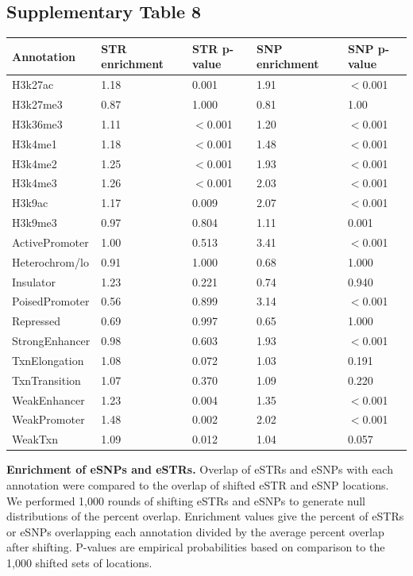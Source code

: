\subsection{Supplementary Table 8}
\label{tab:estrsuptab8}
\begin{table}[h!]
\begin{tabular}{l|l|l|l|l}
Annotation & STR enrichment & STR p-value & SNP enrichment & SNP p-value \\
\hline
H3k27ac & 1.18 & 0.001 & 1.91 & $<$0.001 \\
H3k27me3 & 0.87 & 1.000 & 0.81 & 1.00 \\
H3k36me3 & 1.11 & $<$0.001 & 1.20 & $<$0.001 \\
H3k4me1 & 1.18 & $<$0.001 & 1.48 & $<$0.001 \\
H3k4me2 & 1.25 & $<$0.001 & 1.93 & $<$0.001 \\
H3k4me3 & 1.26 & $<$0.001 & 2.03 & $<$0.001 \\
H3k9ac & 1.17 & 0.009 & 2.07 & $<$0.001 \\
H3k9me3 & 0.97 & 0.804 & 1.11 & 0.001 \\
\hline
ActivePromoter & 1.00 & 0.513 & 3.41 & $<$0.001 \\
Heterochrom/lo & 0.91 & 1.000 & 0.68 & 1.000 \\
Insulator & 1.23 & 0.221 & 0.74 & 0.940 \\
PoisedPromoter & 0.56 & 0.899 & 3.14 & $<$0.001 \\
Repressed & 0.69 & 0.997 & 0.65 & 1.000 \\
StrongEnhancer & 0.98 & 0.603 & 1.93 & $<$0.001  \\
TxnElongation & 1.08 & 0.072 & 1.03 & 0.191 \\
TxnTransition & 1.07 & 0.370 & 1.09 & 0.220 \\
WeakEnhancer & 1.23 & 0.004 & 1.35 & $<$0.001  \\
WeakPromoter & 1.48 & 0.002 & 2.02 & $<$0.001  \\
WeakTxn & 1.09 & 0.012 & 1.04 & 0.057 \\
\hline
\end{tabular}
\end{table}
\textbf{Enrichment of eSNPs and eSTRs.} Overlap of eSTRs and eSNPs with each annotation were compared to the overlap of shifted eSTR and eSNP locations. We performed 1,000 rounds of shifting eSTRs and eSNPs to generate null distributions of the percent overlap. 
Enrichment values give the percent of eSTRs or eSNPs overlapping each annotation divided by the average percent overlap after shifting. P-values are empirical probabilities based on comparison to the 1,000 shifted sets of locations.

